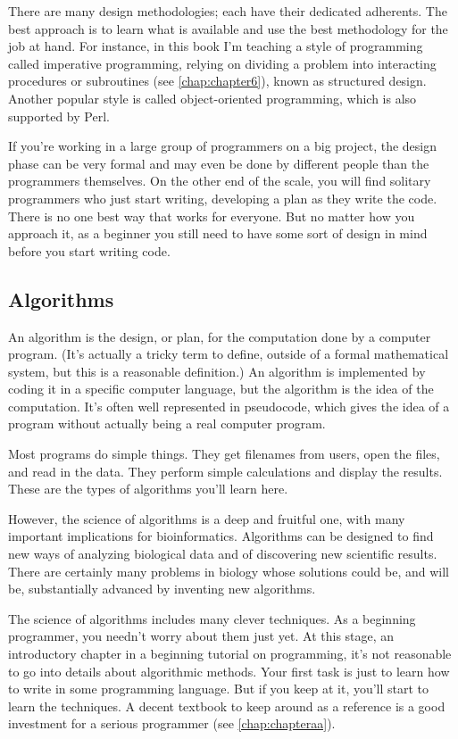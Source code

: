 There are many design methodologies; each have their dedicated adherents. The best approach is to learn what is available and use the best methodology for the job at hand. For instance, in this book I'm teaching a style of programming called imperative programming, relying on dividing a problem into interacting procedures or subroutines (see \autoref{chap:chapter6}), known as structured design. Another popular style is called object-oriented programming, which is also supported by Perl.  

If you're working in a large group of programmers on a big project, the design phase can be very formal and may even be done by different people than the programmers themselves. On the other end of the scale, you will find solitary programmers who just start writing, developing a plan as they write the code. There is no one best way that works for everyone. But no matter how you approach it, as a beginner you still need to have some sort of design in mind before you start writing code. 

\subsection{Algorithms}
An algorithm is the design, or plan, for the computation done by a computer program. (It's actually a tricky term to define, outside of a formal mathematical system, but this is a reasonable definition.) An algorithm is implemented by coding it in a specific computer language, but the algorithm is the idea of the computation. It's often well represented in pseudocode, which gives the idea of a program without actually being a real computer program.

Most programs do simple things. They get filenames from users, open the files, and read in the data. They perform simple calculations and display the results. These are the types of algorithms you'll learn here.

However, the science of algorithms is a deep and fruitful one, with many important implications for bioinformatics. Algorithms can be designed to find new ways of analyzing biological data and of discovering new scientific results. There are certainly many problems in biology whose solutions could be, and will be, substantially advanced by inventing new algorithms.

The science of algorithms includes many clever techniques. As a beginning programmer, you needn't worry about them just yet. At this stage, an introductory chapter in a beginning tutorial on programming, it's not reasonable to go into details about algorithmic methods. Your first task is just to learn how to write in some programming language.  But if you keep at it, you'll start to learn the techniques. A decent textbook to keep around as a reference is a good investment for a serious programmer (see \autoref{chap:chapteraa}).

